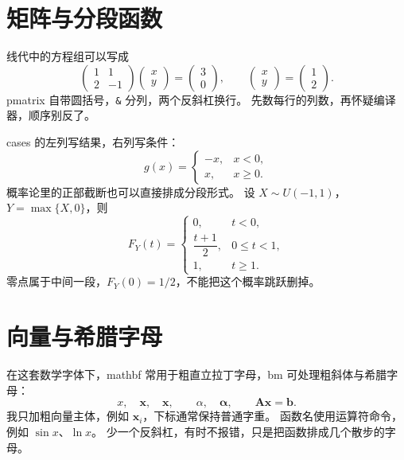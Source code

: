 \documentclass[UTF8,11pt,a4paper,oneside,openany,linespread=1]{ctexbook}
\numberwithin{equation}{chapter}
\begin{document}
\section{矩阵与分段函数}
线代中的方程组可以写成
\[
  \begin{pmatrix}1&1\\2&-1\end{pmatrix}
  \begin{pmatrix}x\\y\end{pmatrix}
  =\begin{pmatrix}3\\0\end{pmatrix},\qquad
  \begin{pmatrix}x\\y\end{pmatrix}=\begin{pmatrix}1\\2\end{pmatrix}.
\]
pmatrix 自带圆括号，\verb|&| 分列，两个反斜杠换行。
先数每行的列数，再怀疑编译器，顺序别反了。

cases 的左列写结果，右列写条件：
\[
  g(x)=\begin{cases}-x,&x<0,\\x,&x\geq0.\end{cases}
\]
概率论里的正部截断也可以直接排成分段形式。
设 \(X\sim U(-1,1)\)，\(Y=\max\{X,0\}\)，则
\[
  F_Y(t)=\begin{cases}
    0,&t<0,\\[3pt]
    \dfrac{t+1}{2},&0\leq t<1,\\[3pt]
    1,&t\geq1.
  \end{cases}
\]
零点属于中间一段，\(F_Y(0)=1/2\)，不能把这个概率跳跃删掉。

\section{向量与希腊字母}
在这套数学字体下，mathbf 常用于粗直立拉丁字母，bm 可处理粗斜体与希腊字母：
\[
  x,\quad\mathbf{x},\quad\bm{x},\qquad
  \alpha,\quad\bm{\alpha},\qquad\mathbf{A}\bm{x}=\bm{b}.
\]
我只加粗向量主体，例如 \(\bm{x}_i\)，下标通常保持普通字重。
函数名使用运算符命令，例如 \(\sin x\)、\(\ln x\)。
少一个反斜杠，有时不报错，只是把函数排成几个散步的字母。
\end{document}
